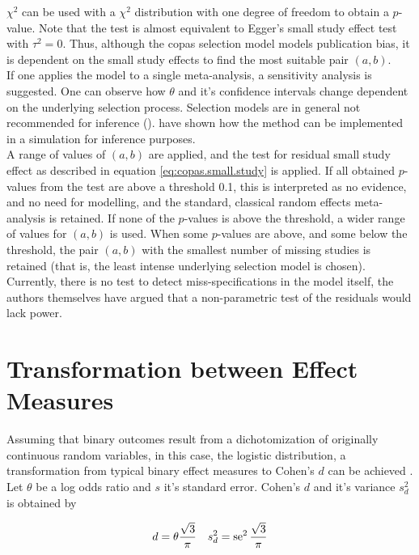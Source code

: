 \documentclass[11pt,a4paper,twoside]{book}\usepackage[]{graphicx}\usepackage[]{color}
\begin{document}
$\chi^2$ can be used with a $\chi^2$ distribution with one degree of freedom to obtain a $p$-value. Note that the test is almost equivalent to Egger's small study effect test with $\tau^2 = 0$. Thus, although the copas selection model models publication bias, it is dependent on the small study effects to find the most suitable pair $(a,b)$. \\
If one applies the model to a single meta-analysis, a sensitivity analysis is suggested. One can observe how $\theta$ and it's confidence intervals change dependent on the underlying selection process. Selection models are in general not recommended for inference (\eg \citet{selection.assessment}). 
\citet{limitmeta} have shown how the method can be implemented in a simulation for inference purposes. \\
A range of values of $(a,b)$ are applied, and the test for residual small study effect as described in equation \eqref{eq:copas.small.study} is applied. If all obtained $p$-values from the test are above a threshold 0.1, this is interpreted as no evidence, and no need for modelling, and the standard, classical random effects meta-analysis is retained. If none of the $p$-values is above the threshold, a wider range of values for $(a,b)$ is used. When some $p$-values are above, and some below the threshold, the pair $(a,b)$ with the smallest number of missing studies is retained (that is, the least intense underlying selection model is chosen).\\
Currently, there is no test to detect miss-specifications in the model itself, the authors themselves have argued that a non-parametric test of the residuals would lack power.



\section{Transformation between Effect Measures} \label{sec:transformation.effectsizes}
Assuming that binary outcomes result from a dichotomization of originally continuous random variables, in this case, the logistic distribution, a transformation from typical binary effect measures to Cohen's $d$ can be achieved \cite[47]{Intro.meta}. \\
Let $\theta$ be a log odds ratio and $s$ it's standard error. Cohen's $d$ and it's variance $s_d^2$ is obtained by

\begin{align}
d &= \theta \frac{\sqrt{3}}{\pi} & s_d^2 =  \operatorname{se}^2\frac{\sqrt{3}}{\pi} \nonumber
\end{align}
\end{document}
